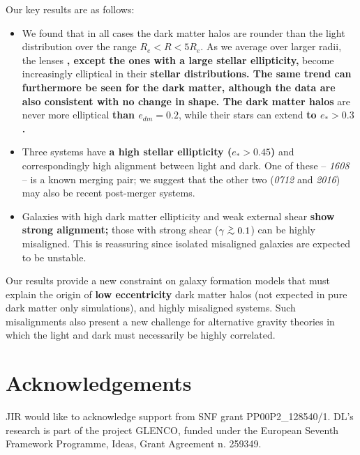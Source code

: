 \documentclass[useAMS,usenatbib]{mn2e}
\def\gtsima{$\; \buildrel > \over \sim \;$}
\def\simgt{\lower.5ex\hbox{\gtsima}}
\newcommand{\cb}[1]{{\color{red} \textbf{#1}}}
\begin{document}
Our key results are as follows:

\begin{itemize}
\item We found that in all cases the dark matter halos are rounder than the light distribution over the range $R_e < R < 5R_e$. As we average over larger radii, the lenses\cb{, except the ones with a large stellar ellipticity,} become increasingly elliptical in their \cb{stellar distributions. The same trend can furthermore be seen for the dark matter, although the data are also consistent with no change in shape. The dark matter halos} are never more elliptical \cb{than $e_{dm} = 0.2$}, while their stars can extend \cb{to $e_* > 0.3$.} 

\item Three systems have \cb{a high stellar ellipticity ($e_* > 0.45$)} and correspondingly high alignment between light and dark. One of these -- {\it1608} -- is a known merging pair; we suggest that the other two ({\it0712} and {\it2016}) may also be recent post-merger systems. 

\item Galaxies with high dark matter ellipticity and weak external shear \cb{show strong alignment;} those with strong shear ($\gamma \simgt 0.1$) can be highly misaligned. This is reassuring since isolated misaligned galaxies are expected to be unstable.
\end{itemize}

Our results provide a new constraint on galaxy formation models that must explain the origin of \cb{low eccentricity} dark matter halos (not expected in pure dark matter only simulations), and highly misaligned systems. Such misalignments also present a new challenge for alternative gravity theories in which the light and dark must necessarily be highly correlated.


\section{Acknowledgements}\label{sec:acknowledgements}
JIR would like to acknowledge support from SNF grant PP00P2\_128540/1. DL's research is part of the project GLENCO, funded under the European Seventh Framework Programme, Ideas, Grant Agreement n. 259349.






\appendix
\end{document}
